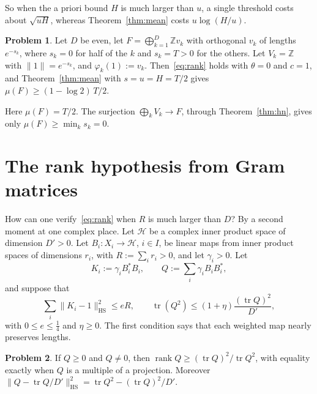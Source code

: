 \documentclass[reqno]{amsart}
\theoremstyle{definition}
\newtheorem{problem}{Problem}[section]
\theoremstyle{plain}
\newcommand{\Z}{\mathbb{Z}}
\newcommand{\Hc}{\mathcal{H}}
\newcommand{\tr}{\operatorname{tr}}
\newcommand{\HS}{\mathrm{HS}}
\begin{document}
So when the a priori bound \(H\) is much larger than \(u\), a single threshold costs about \(\sqrt{uH}\), whereas Theorem~\ref{thm:mean} costs \(u\log(H/u)\).

\begin{problem}\label{pr:toy}
Let \(D\) be even, let \(F = \bigoplus_{k=1}^D \Z v_k\) with orthogonal \(v_k\) of lengths \(e^{-s_k}\), where \(s_k = 0\) for half of the \(k\) and \(s_k = T > 0\) for the others.  Let \(V_k = \Z\) with \(\lVert 1 \rVert = e^{-s_k}\), and \(\varphi_k(1) := v_k\).  Then~\eqref{eq:rank} holds with \(\theta = 0\) and \(c = 1\), and Theorem~\ref{thm:mean} with \(s = u = H = T/2\) gives \(\mu(F) \ge (1 - \log 2)\,T/2\).
\end{problem}

Here \(\mu(F) = T/2\).  The surjection \(\bigoplus_k V_k \to F\), through Theorem~\ref{thm:hn}, gives only \(\mu(F) \ge \min_k s_k = 0\).

\section{The rank hypothesis from Gram matrices}\label{sec:gram}

How can one verify~\eqref{eq:rank} when \(R\) is much larger than \(D\)?  By a second moment at one complex place.  Let \(\Hc\) be a complex inner product space of dimension \(D' > 0\).  Let \(B_i \colon X_i \to \Hc\), \(i \in I\), be linear maps from inner product spaces of dimensions \(r_i\), with \(R := \sum_i r_i > 0\), and let \(\gamma_i > 0\).  Let
\[
  K_i := \gamma_i B_i^* B_i , \qquad Q := \sum_i \gamma_i B_i B_i^* ,
\]
and suppose that
\begin{equation}\label{eq:gram}
  \sum_i \lVert K_i - 1 \rVert_\HS^2 \le eR , \qquad \tr(Q^2) \le (1 + \eta) \frac{(\tr Q)^2}{D'} ,
\end{equation}
with \(0 \le e \le \tfrac14\) and \(\eta \ge 0\).  The first condition says that each weighted map nearly preserves lengths.

\begin{problem}\label{pr:rank}
If \(Q \ge 0\) and \(Q \ne 0\), then \(\operatorname{rank} Q \ge (\tr Q)^2/\tr Q^2\), with equality exactly when \(Q\) is a multiple of a projection.  Moreover \(\lVert Q - \tr Q/D' \rVert_\HS^2 = \tr Q^2 - (\tr Q)^2/D'\).
\end{problem}
\end{document}
